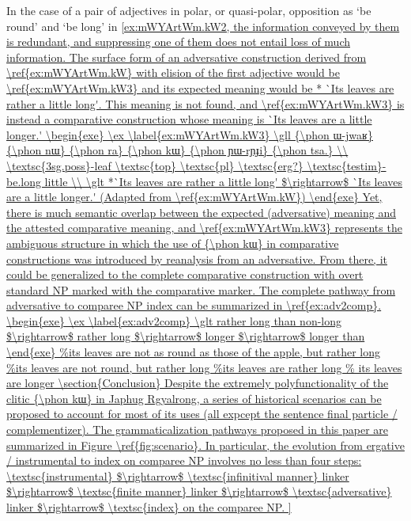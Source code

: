 \documentclass[oldfontcommands,oneside,a4paper,11pt]{article}
\newcommand{\ipa}[1]{{\phon #1}} %
\begin{document}
          In the case of a pair of adjectives in polar, or quasi-polar, opposition as `be round' and  `be long' in \ref{ex:mWYArtWm.kW2, the information conveyed by them is redundant, and suppressing one of them does not entail loss of much information.  The surface form of an adversative construction derived from \ref{ex:mWYArtWm.kW}  with elision  of the first adjective would be    \ref{ex:mWYArtWm.kW3}  and its expected meaning would be * `Its leaves are  rather a little long'.
          
          This meaning is not found, and \ref{ex:mWYArtWm.kW3}   is instead a comparative construction whose meaning is `Its leaves are a little longer.' 
            
                      \begin{exe}
  \ex  \label{ex:mWYArtWm.kW3}  
  \gll      
\ipa{ɯ-jwaʁ} 	\ipa{nɯ}   \ipa{ra} 	\ipa{kɯ} 	\ipa{ɲɯ-rɲɟi} 	\ipa{tsa.} \\
\textsc{3sg.poss}-leaf \textsc{top} \textsc{pl}   \textsc{erg?} \textsc{testim}-be.long little \\
\glt *`Its leaves are rather a little long'  $\rightarrow$  `Its leaves are a little longer.'
(Adapted from \ref{ex:mWYArtWm.kW})
          \end{exe} 
  
  
  Yet, there is much semantic overlap   between the expected (adversative) meaning and the attested comparative meaning, and \ref{ex:mWYArtWm.kW3}   represents the ambiguous structure in which the use of \ipa{kɯ} in comparative constructions was introduced by reanalysis from an adversative.
  
  From there, it could be generalized to the complete comparative construction with overt standard NP marked with the comparative marker. The complete pathway from adversative to comparee NP index can be summarized in \ref{ex:adv2comp}.
  
  \begin{exe}
\ex \label{ex:adv2comp}
\glt rather long than non-long $\rightarrow$ rather long $\rightarrow$   longer $\rightarrow$ longer than
\end{exe}
  
 


  \section{Conclusion}
Despite the extremely polyfunctionality of the    clitic \ipa{kɯ} in Japhug Rgyalrong, a series of historical scenarios can be proposed to account for most of its uses (all expcept the sentence final particle / complementizer). The grammaticalization pathways  proposed in this paper are summarized in Figure \ref{fig:scenario}. In particular, the evolution from ergative / instrumental to index on comparee NP involves no less than four steps: \textsc{instrumental} $\rightarrow$ \textsc{infinitival manner} linker $\rightarrow$  \textsc{finite manner} linker $\rightarrow$  \textsc{adversative} linker $\rightarrow$  \textsc{index} on the comparee NP.

}
\end{document}
